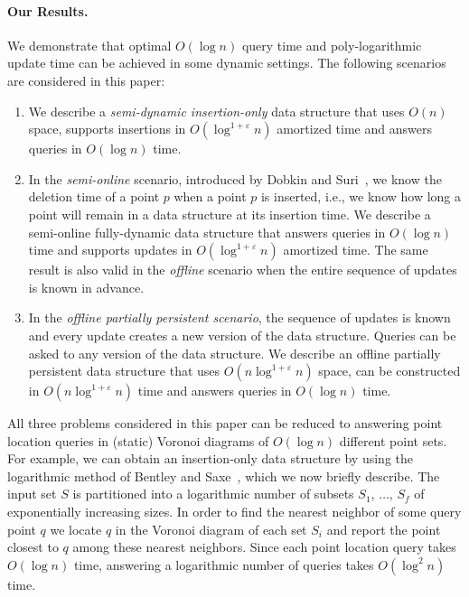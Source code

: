 \documentclass[10pt,a4paper]{amsart}
\newcommand{\eps}{\varepsilon}
\begin{document}
\paragraph*{Our Results.}
We demonstrate that optimal $O(\log n)$ query time and poly-logarithmic update time can be achieved in some dynamic settings. The following scenarios are considered in this paper:
\begin{enumerate}
\item  We describe a \emph{semi-dynamic insertion-only} data structure that uses $O(n)$ space, supports insertions in $O(\log^{1+\eps}n)$ amortized time and answers queries in $O(\log n)$ time.
\item 
  In the \emph{semi-online} scenario, introduced by Dobkin and Suri~\cite{DobkinS91}, we know the deletion time of a point $p$ when a  point $p$ is inserted, i.e., we know how long a point will remain in a data structure at its insertion time.
  We describe a semi-online fully-dynamic data structure that answers queries in $O(\log n)$ time and supports updates in $O(\log^{1+\eps} n)$ amortized time. The same result is also valid in the \emph{offline} scenario when the entire sequence of updates is known in advance.
\item
  In the \emph{offline partially persistent scenario}, the sequence of updates is known and every update creates a new version of the data structure.  Queries can be asked to any version of the data structure. We describe an offline partially persistent data structure that uses $O(n\log^{1+\eps}n)$ space, can be constructed in $O(n\log^{1+\eps}n)$ time and answers queries in $O(\log n)$ time.    
\end{enumerate}

All three problems considered in this paper can be reduced to answering point location queries in (static) Voronoi diagrams of $O(\log n)$ different point sets.
For example, we can obtain an insertion-only data structure by using the logarithmic method of Bentley and Saxe~\cite{BentleyS80}, which we now briefly describe.
The input set $S$  is partitioned into a logarithmic number of subsets $S_1$, $\ldots$, $S_f$ of exponentially increasing sizes.
In order to find the nearest neighbor of some query point $q$ we locate $q$ in the Voronoi diagram of each set $S_i$ and report the point closest to $q$ among these nearest neighbors.
Since each  point location query takes $O(\log n)$ time, answering a logarithmic number of queries takes  $O(\log^2 n)$ time.   
\end{document}
